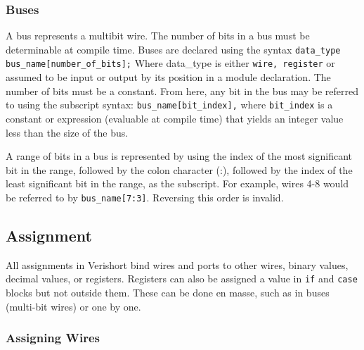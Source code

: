 \documentclass[letterpaper,11pt]{article}
\begin{document}
        \subsubsection{Buses}
        A bus represents a multibit wire. The number of bits in a bus must be determinable at compile 
        time. Buses are declared using the syntax \texttt{data\_type bus\_name[number\_of\_bits];} Where 
        data\_type is either \texttt{wire, register} or assumed to be input or output by its position in a module 
        declaration. The number of bits must be a constant. From here, any bit in the bus may be referred 
        to using the subscript syntax: \texttt{bus\_name[bit\_index],} where \texttt{bit\_index} is a constant or expression (evaluable at compile time) that yields an integer value less than the size of the bus. 
        
        A range of bits in a bus is represented by using the index of the most significant bit in the 
        range, followed by the colon character (:), followed by the index of the least significant 
        bit in the range, as the subscript. For example, wires 4-8 would be referred to by \texttt{bus\_name[7:3]}. 
        Reversing this order is invalid.
        
    \subsection{Assignment}
    All assignments in Verishort bind wires and ports to other wires, binary values, decimal values, or registers.  Registers can also be assigned a value in \texttt{if} and \texttt{case} blocks but not outside them. 
    These can be done en masse, such as in buses (multi-bit wires) or one by one.
    
        \subsubsection{Assigning Wires}
        
\end{document}
